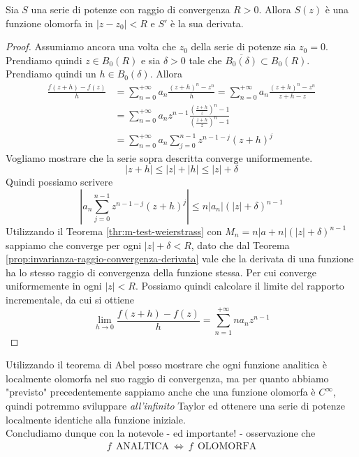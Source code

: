 \begin{theorem}
	\label{thr:teorema-di-abel}
	Sia $S$ una serie di potenze con raggio di convergenza $R > 0$. Allora $S(z)$ è una funzione olomorfa in $|z-z_0| < R$ e $S'$ è la sua derivata.
\end{theorem}
\begin{proof}
	Assumiamo ancora una volta che $z_0$ della serie di potenze sia $z_0 = 0$. Prendiamo quindi $z \in B_0(R)$ e sia $\delta > 0$ tale che $\overline{B_0(\delta)} \subset B_0(R)$. Prendiamo quindi un $h \in B_0(\delta)$. Allora
	\begin{equation*}
	\begin{aligned}
		\frac{f(z+h) - f(z)}{h} & = \sum^{+\infty}_{n=0} a_n \frac{(z+h)^n - z^n}{h} = \sum^{+\infty}_{n=0} a_n \frac{(z+h)^n-z^n}{z+h-z} \\
								& = \sum^{+\infty}_{n=0} a_n z^{n-1} \frac{\left(\frac{z+h}{z}\right)^n - 1}{\left(\frac{z+h}{z}\right)^n - 1} \\
								& = \sum^{+\infty}_{n=0} a_n \sum^{n-1}_{j=0} z^{n-1-j}(z+h)^j 
	\end{aligned}
	\end{equation*}
	Vogliamo mostrare che la serie sopra descritta converge uniformemente.
	\begin{equation*}
		|z+h| \le |z| + |h| \le |z| + \delta
	\end{equation*}
	Quindi possiamo scrivere 
	\begin{equation*}
		\left|a_n \sum^{n-1}_{j=0} z^{n-1-j}(z+h)^j \right| \le n|a_n|(|z|+\delta)^{n-1} 
	\end{equation*}
	Utilizzando il Teorema \ref{thr:m-test-weierstrass} con $M_n = n|a+n|(|z|+\delta)^{n-1}$ sappiamo che converge per ogni $|z|+\delta < R$, dato che dal Teorema \ref{prop:invarianza-raggio-convergenza-derivata} vale che la derivata di una funzione ha lo stesso raggio di convergenza della funzione stessa. Per cui converge uniformemente in ogni $|z| < R$. 
	Possiamo quindi calcolare il limite del rapporto incrementale, da cui si ottiene 
	\begin{equation*}
		\lim_{h\to 0} \frac{f(z+h) - f(z)}{h} = \sum^{+\infty}_{n=1} na_nz^{n-1}
	\end{equation*}
\end{proof}

\begin{remark}
	Utilizzando il teorema di Abel posso mostrare che ogni funzione analitica è localmente olomorfa nel suo raggio di convergenza, ma per quanto abbiamo "previsto" precedentemente sappiamo anche che una funzione olomorfa è $C^\infty$, quindi potremmo sviluppare \textit{all'infinito} Taylor ed ottenere una serie di potenze localmente identiche alla funzione iniziale. \\ Concludiamo dunque con la notevole - ed importante! - osservazione che
	\begin{equation*}
	\begin{aligned}
		f \ \ \textrm{ANALTICA} \ \Longleftrightarrow \ f \ \  \mathrm{OLOMORFA}
	\end{aligned}
	\end{equation*}
\end{remark}

